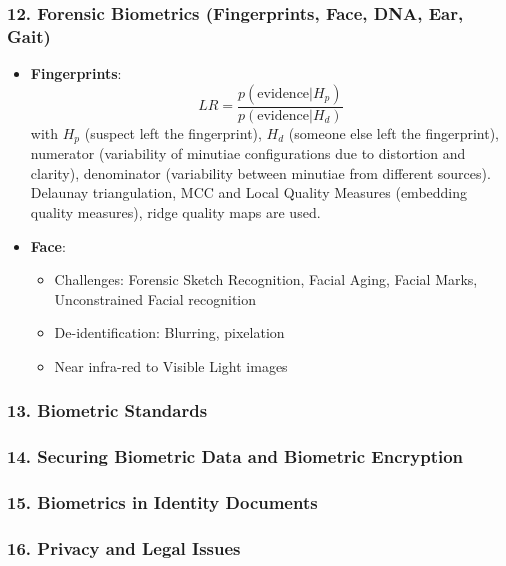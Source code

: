 \documentclass[a4paper]{article}
\begin{document}
    \subsubsection*{12. Forensic Biometrics (Fingerprints, Face, DNA, Ear, Gait)}
      \begin{itemize}
        \item \textbf{Fingerprints}: $$LR = \frac{p(\text{evidence}|H_p)}{p(\text{evidence}|H_d)}$$
        with $H_p$ (suspect left the fingerprint), $H_d$ (someone else left the fingerprint), numerator (variability of minutiae configurations due to distortion and clarity), denominator (variability between minutiae from different sources). Delaunay triangulation, MCC and Local Quality Measures (embedding quality measures), ridge quality maps are used.
        \item \textbf{Face}:
        \begin{itemize}
          \item Challenges: Forensic Sketch Recognition, Facial Aging, Facial Marks, Unconstrained Facial recognition
          \item De-identification: Blurring, pixelation
          \item Near infra-red to Visible Light images
        \end{itemize}
      \end{itemize}
    \subsubsection*{13. Biometric Standards}
    \subsubsection*{14. Securing Biometric Data and Biometric Encryption}
    \subsubsection*{15. Biometrics in Identity Documents}
    \subsubsection*{16. Privacy and Legal Issues}
\end{document}
